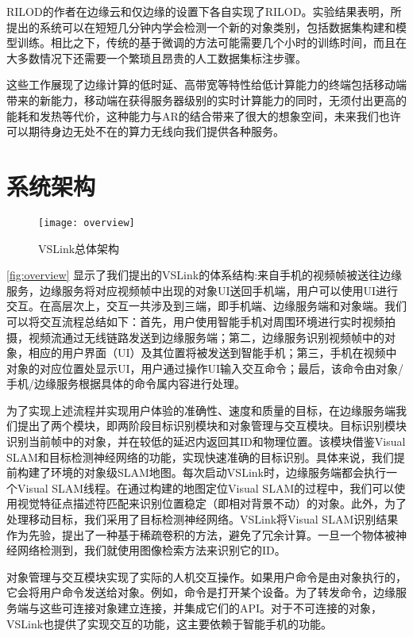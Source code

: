 RILOD的作者在边缘云和仅边缘的设置下各自实现了RILOD。实验结果表明，所提出的系统可以在短短几分钟内学会检测一个新的对象类别，包括数据集构建和模型训练。相比之下，传统的基于微调的方法可能需要几个小时的训练时间，而且在大多数情况下还需要一个繁琐且昂贵的人工数据集标注步骤。

这些工作展现了边缘计算的低时延、高带宽等特性给低计算能力的终端包括移动端带来的新能力，移动端在获得服务器级别的实时计算能力的同时，无须付出更高的能耗和发热等代价，这种能力与AR的结合带来了很大的想象空间，未来我们也许可以期待身边无处不在的算力无线向我们提供各种服务。


\chapter{系统架构}
\label{chap:architec}

\begin{figure}[htb]
	\centering
	\texttt{[image: overview]}
	\caption{VSLink总体架构}
	\label{fig:overview}
\end{figure}

\autoref{fig:overview} 显示了我们提出的VSLink的体系结构:来自手机的视频帧被送往边缘服务，边缘服务将对应视频帧中出现的对象UI送回手机端，用户可以使用UI进行交互。在高层次上，交互一共涉及到三端，即手机端、边缘服务端和对象端。我们可以将交互流程总结如下：首先，用户使用智能手机对周围环境进行实时视频拍摄，视频流通过无线链路发送到边缘服务端；第二，边缘服务识别视频帧中的对象，相应的用户界面（UI）及其位置将被发送到智能手机；第三，手机在视频中对象的对应位置处显示UI，用户通过操作UI输入交互命令；最后，该命令由对象/手机/边缘服务根据具体的命令属内容进行处理。

为了实现上述流程并实现用户体验的准确性、速度和质量的目标，在边缘服务端我们提出了两个模块，即两阶段目标识别模块和对象管理与交互模块。目标识别模块识别当前帧中的对象，并在较低的延迟内返回其ID和物理位置。该模块借鉴Visual SLAM和目标检测神经网络的功能，实现快速准确的目标识别。具体来说，我们提前构建了环境的对象级SLAM地图。每次启动VSLink时，边缘服务端都会执行一个Visual SLAM线程。在通过构建的地图定位Visual SLAM的过程中，我们可以使用视觉特征点描述符匹配来识别位置稳定（即相对背景不动）的对象。此外，为了处理移动目标，我们采用了目标检测神经网络。VSLink将Visual SLAM识别结果作为先验，提出了一种基于稀疏卷积的方法，避免了冗余计算。一旦一个物体被神经网络检测到，我们就使用图像检索方法来识别它的ID。

对象管理与交互模块实现了实际的人机交互操作。如果用户命令是由对象执行的，它会将用户命令发送给对象。例如，命令是打开某个设备。为了转发命令，边缘服务端与这些可连接对象建立连接，并集成它们的API。对于不可连接的对象，VSLink也提供了实现交互的功能，这主要依赖于智能手机的功能。

